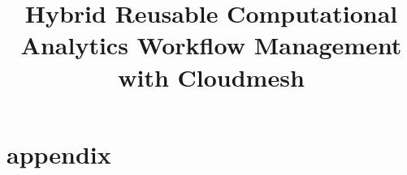 \documentclass[sigplan,screen]{acmart}
\begin{document}
\title{Hybrid Reusable Computational Analytics Workflow Management with Cloudmesh}

% 

\begin{abstract}



\end{abstract}


  



\maketitle




























\section{appendix}



\end{document}
